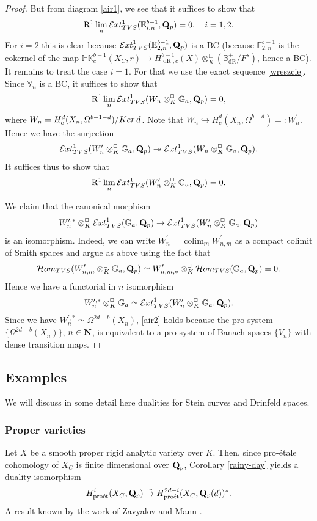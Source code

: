 \documentclass[10pt,reqno]{amsart}
\theoremstyle{definition}
\theoremstyle{remark}
\newcommand{\dr}{\operatorname{dR} }
\newcommand{\colim}{\operatorname{colim} }
\newcommand{\proeet}{\operatorname{pro\acute{e}t} }
\numberwithin{equation}{section}
\def\R{{\mathrm R}}
\def\Q{{\bf Q}} \def\Z{{\bf Z}}
\def\N{{\bf N}}
\numberwithin{equation}{section}
\begin{document}
\begin{proof}
    But from diagram  \eqref{air1}, we see that  it suffices to show that
 $$
 \R^1\lim_n {\mathcal Ext}^1_{\rm TVS}(\mathbb{E}^{b-1}_{i,n},\Q_p)=0,\quad i=1,2.
 $$
 For $i=2$ this is clear because ${\mathcal Ext}^1_{\rm TVS}(\mathbb{E}^{b-1}_{2,n},\Q_p)$ is a BC (because  $\mathbb{E}^{b-1}_{2,n}$ is the cokernel of the map $\mathbb{HK}^{b-1}_c(X_C,r) \to H^{b-1}_{\dr,c}(X)\otimes^{\Box}_K({\mathbb B}^+_{\dr}/F^s)$, hence a BC). It remains to treat the case $i=1$. For that we use the exact sequence \eqref{wreszcie}. Since $\mathbb{V}_n$ is a BC, it suffices to show that
 $$
  \R^1\lim_n {\mathcal Ext}^1_{\rm TVS}(W_n\otimes^{\Box}_{K}\mathbb{G}_a,\Q_p)=0,
 $$
 where $W_n=H^d_c(X_n,\Omega^{b-1-d})/{\rm Ker}\, d$. 
Note that $W_n\hookrightarrow H^d_c(X_n,\Omega^{b-d})=:W^{\prime}_n$.  Hence we have the surjection $$
  {\mathcal Ext}^1_{\rm TVS}(W^{\prime}_n\otimes^{\Box}_{K}\mathbb{G}_a,\Q_p)\twoheadrightarrow {\mathcal Ext}^1_{\rm TVS}(W_n\otimes^{\Box}_{K}\mathbb{G}_a,\Q_p).
$$
It suffices thus to show that
\begin{equation}\label{air2}
  \R^1\lim_n {\mathcal Ext}^1_{\rm TVS}(W^{\prime}_n\otimes^{\Box}_{K}\mathbb{G}_a,\Q_p)=0.
\end{equation}

      We claim that the canonical morphism
   $$
   W^{\prime,*}_n\otimes^{\Box}_{K}{\mathcal Ext}^1_{\rm TVS}(\mathbb{G}_a,\Q_p)\to {\mathcal Ext}^1_{\rm TVS}(W^{\prime}_n\otimes^{\Box}_{K}\mathbb{G}_a,\Q_p)
   $$
   is an isomorphism. Indeed, we can write $W^{\prime}_n=\colim_mW^{\prime}_{n,m}$ as a compact colimit of Smith spaces and argue as above using the fact that 
   $${\mathcal Hom}_{\rm TVS}(W^{\prime}_{n,m}\otimes^{\Box}_{K}\mathbb{G}_a,\Q_p)\simeq W^{\prime}_{n,m,*}\otimes^{\Box}_{K}
   {\mathcal Hom}_{\rm TVS}(\mathbb{G}_a,\Q_p)=0.
   $$
   Hence we have a functorial in $n$ isomorphism
   $$
    W^{\prime,*}_n\otimes^{\Box}_{K}{\mathbb G}_a\simeq  {\mathcal Ext}^1_{\rm TVS}(W^{\prime}_n\otimes^{\Box}_{K}\mathbb{G}_a,\Q_p).
   $$
   Since we have $W^{\prime,*}_n\simeq \Omega^{2d-b}(X_n)$,
 \eqref{air2} holds because the pro-system $\{\Omega^{2d-b}(X_{n})\}$, $n\in\N$, is equivalent to a pro-system of Banach spaces $\{V_n\}$ with  dense transition maps.
\end{proof}
\subsection{Examples} 
We will discuss in some detail here dualities for Stein curves and Drinfeld spaces. 
\subsubsection{Proper varieties} 
Let $X$ be a smooth proper rigid analytic variety over $K$. Then, since pro-\'etale cohomology of $X_C$  is finite dimensional over $\Q_p$,  Corollary \ref{rainy-day} yields a duality isomorphism 
$$
{H}^i_{\proeet}(X_C,\Q_p)\stackrel{\sim}{\to}
{H}^{2d-i}_{\proeet}(X_C,\Q_p(d))^*.
$$
A result known by the work of Zavyalov \cite{Zav} and Mann \cite{Mann}. 
\end{document}
